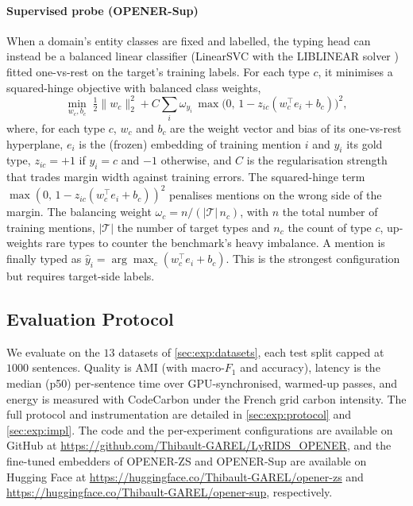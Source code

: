 \paragraph{Supervised probe (OPENER-Sup)}
When a domain's entity classes are fixed and labelled, the typing head can instead be a balanced linear classifier (LinearSVC with the LIBLINEAR solver \cite{fan2008liblinear}) fitted one-vs-rest on the target's training labels.
For each type $c$, it minimises a squared-hinge objective with balanced class weights,
\begin{equation}
\min_{w_c,b_c}\;\tfrac12\lVert w_c\rVert_2^2+C\sum_i \omega_{y_i}\,\max\!\big(0,\,1-z_{ic}(w_c^{\top} e_i+b_c)\big)^2,
\end{equation}
where, for each type $c$, $w_c$ and $b_c$ are the weight vector and bias of its one-vs-rest hyperplane, $e_i$ is the (frozen) embedding of training mention $i$ and $y_i$ its gold type, $z_{ic}{=}{+}1$ if $y_i{=}c$ and ${-}1$ otherwise, and $C$ is the regularisation strength that trades margin width against training errors. The squared-hinge term $\max(0,\,1-z_{ic}(w_c^{\top}e_i+b_c))^2$ penalises mentions on the wrong side of the margin. The balancing weight $\omega_c=n/(|\mathcal{T}|\,n_c)$, with $n$ the total number of training mentions, $|\mathcal{T}|$ the number of target types and $n_c$ the count of type $c$, up-weights rare types to counter the benchmark's heavy imbalance. A mention is finally typed as $\hat y_i=\arg\max_c (w_c^{\top}e_i+b_c)$.
This is the strongest configuration but requires target-side labels.

\subsection{Evaluation Protocol}
\label{sec:method:eval}
We evaluate on the $13$ datasets of \autoref{sec:exp:datasets}, each test split capped at $1000$ sentences.
Quality is AMI \cite{vinh2010ami} (with macro-$F_1$ and accuracy), latency is the median (p50) per-sentence time over GPU-synchronised, warmed-up passes, and energy is measured with CodeCarbon \cite{luccioni2019quantifying} under the French grid carbon intensity. The full protocol and instrumentation are detailed in \autoref{sec:exp:protocol} and \autoref{sec:exp:impl}.
The code and the per-experiment configurations are available on GitHub at \url{https://github.com/Thibault-GAREL/LyRIDS_OPENER}, and the fine-tuned embedders of OPENER-ZS and OPENER-Sup are available on Hugging Face at \url{https://huggingface.co/Thibault-GAREL/opener-zs} and \url{https://huggingface.co/Thibault-GAREL/opener-sup}, respectively.
